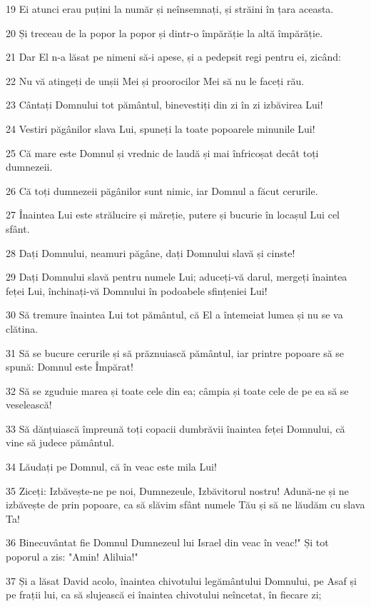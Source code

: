 \par 19 Ei atunci erau puțini la număr și neînsemnați, și străini în țara aceasta.
\par 20 Și treceau de la popor la popor și dintr-o împărăție la altă împărăție.
\par 21 Dar El n-a lăsat pe nimeni să-i apese, și a pedepsit regi pentru ei, zicând:
\par 22 Nu vă atingeți de unșii Mei și proorocilor Mei să nu le faceți rău.
\par 23 Cântați Domnului tot pământul, binevestiți din zi în zi izbăvirea Lui!
\par 24 Vestiri păgânilor slava Lui, spuneți la toate popoarele minunile Lui!
\par 25 Că mare este Domnul și vrednic de laudă și mai înfricoșat decât toți dumnezeii.
\par 26 Că toți dumnezeii păgânilor sunt nimic, iar Domnul a făcut cerurile.
\par 27 Înaintea Lui este strălucire și măreție, putere și bucurie în locașul Lui cel sfânt.
\par 28 Dați Domnului, neamuri păgâne, dați Domnului slavă și cinste!
\par 29 Dați Domnului slavă pentru numele Lui; aduceți-vă darul, mergeți înaintea feței Lui, închinați-vă Domnului în podoabele sfințeniei Lui!
\par 30 Să tremure înaintea Lui tot pământul, că El a întemeiat lumea și nu se va clătina.
\par 31 Să se bucure cerurile și să prăznuiască pământul, iar printre popoare să se spună: Domnul este Împărat!
\par 32 Să se zguduie marea și toate cele din ea; câmpia și toate cele de pe ea să se veselească!
\par 33 Să dănțuiască împreună toți copacii dumbrăvii înaintea feței Domnului, că vine să judece pământul.
\par 34 Lăudați pe Domnul, că în veac este mila Lui!
\par 35 Ziceți: Izbăvește-ne pe noi, Dumnezeule, Izbăvitorul nostru! Adună-ne și ne izbăvește de prin popoare, ca să slăvim sfânt numele Tău și să ne lăudăm cu slava Ta!
\par 36 Binecuvântat fie Domnul Dumnezeul lui Israel din veac în veac!" Și tot poporul a zis: "Amin! Aliluia!"
\par 37 Și a lăsat David acolo, înaintea chivotului legământului Domnului, pe Asaf și pe frații lui, ca să slujească ei înaintea chivotului neîncetat, în fiecare zi;
